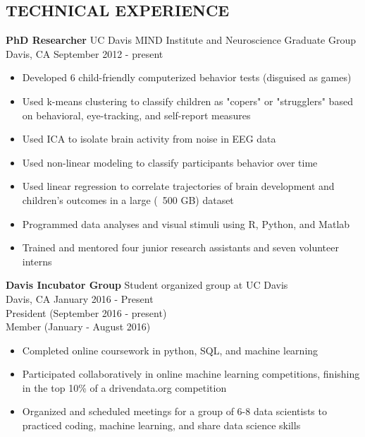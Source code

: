 \documentclass[line,margin,10pt]{res}
\begin{document}
\begin{resume}
\section{TECHNICAL EXPERIENCE}
\textbf{PhD Researcher} \hfill UC Davis MIND Institute and Neuroscience Graduate Group\\ 
Davis, CA \hfill September 2012 - present
\begin{itemize} \itemsep -2pt
\item Developed 6 child-friendly computerized behavior tests (disguised as games)
\item Used k-means clustering to classify children as "copers" or "strugglers" based on behavioral, eye-tracking, and self-report measures
\item Used ICA to isolate brain activity from noise in EEG data
\item Used non-linear modeling to classify participants behavior over time
\item Used linear regression to correlate trajectories of brain development and children's outcomes in a large (~500 GB) dataset
\item Programmed data analyses and visual stimuli using R, Python, and Matlab
\item Trained and mentored four junior research assistants and seven volunteer interns
\end{itemize}

\textbf{Davis Incubator Group} \hfill Student organized group at UC Davis\\
Davis, CA \hfill January 2016 - Present\\
President \hfill (September 2016 - present)\\
Member \hfill (January - August 2016) 
\begin{itemize} \itemsep -2pt
\item Completed online coursework in python, SQL, and machine learning
\item Participated collaboratively in online machine learning competitions, finishing in the top 10\% of a drivendata.org competition
\item Organized and scheduled meetings for a group of 6-8 data scientists to practiced coding, machine learning, and share data science skills
\end{itemize}


\end{resume}
\end{document}
